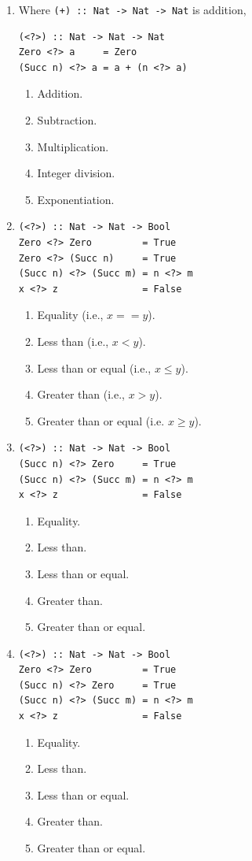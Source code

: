 \documentclass[12pt]{article}
\begin{document}
\begin{enumerate}[resume]
\item Where {\tt (+) :: Nat -> Nat -> Nat} is addition,
\begin{verbatim}
(<?>) :: Nat -> Nat -> Nat
Zero <?> a     = Zero
(Succ n) <?> a = a + (n <?> a)
\end{verbatim}
\begin{enumerate}
\item Addition.
\item Subtraction.
\item Multiplication.
\item Integer division.
\item Exponentiation.
\end{enumerate}

\pagebreak

\item \begin{verbatim}
(<?>) :: Nat -> Nat -> Bool
Zero <?> Zero         = True
Zero <?> (Succ n)     = True
(Succ n) <?> (Succ m) = n <?> m
x <?> z               = False
\end{verbatim}
\begin{enumerate}
\item Equality (i.e., $x == y$).
\item Less than (i.e., $x < y$).
\item Less than or equal (i.e., $x \leq y$).
\item Greater than (i.e., $x > y$).
\item Greater than or equal (i.e. $x \geq y$).
\end{enumerate}

\item \begin{verbatim}
(<?>) :: Nat -> Nat -> Bool
(Succ n) <?> Zero     = True
(Succ n) <?> (Succ m) = n <?> m
x <?> z               = False
\end{verbatim}
\begin{enumerate}
\item Equality.
\item Less than.
\item Less than or equal.
\item Greater than.
\item Greater than or equal.
\end{enumerate}

\item \begin{verbatim}
(<?>) :: Nat -> Nat -> Bool
Zero <?> Zero         = True
(Succ n) <?> Zero     = True
(Succ n) <?> (Succ m) = n <?> m
x <?> z               = False
\end{verbatim}
\begin{enumerate}
\item Equality.
\item Less than.
\item Less than or equal.
\item Greater than.
\item Greater than or equal.
\end{enumerate}


\end{enumerate}
\end{document}
